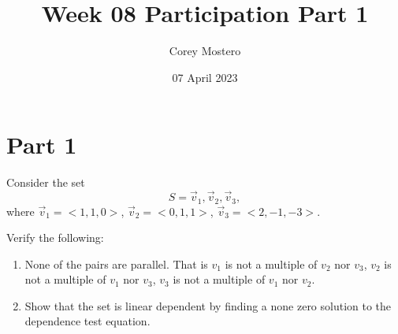 \documentclass{article}
\begin{document}
\title{Week 08 Participation Part 1}
\date{07 April 2023}
\author{Corey Mostero}

\newcommand{\hr}{\par\noindent\rule{\textwidth}{0.4pt}}

\newcommand{\bc}[1]{
	\begin{equation*}
		\begin{boxed}
			{#1}
		\end{boxed}
	\end{equation*}
}

\newcommand{\cond}[2]{
	\ifmmode
		{#1} \quad {#2}
	\else
		$$ {#1} \quad {#2} $$
	\fi
}

\maketitle
\newpage

\tableofcontents

\section{Part 1}
Consider the set
$$ S = { \vec{v}_1, \vec{v}_2, \vec{v}_3 }, $$
where $ \vec{v}_1 = <1,1,0> $, $ \vec{v}_2 = <0,1,1> $, $ \vec{v}_3 = <2,-1,-3> $.

Verify the following:
\begin{enumerate}[label=\textbf{\alph*)}]
	\item None of the pairs are parallel. That is $ v_1 $ is not a multiple of $ v_2 $ nor $ v_3 $, $ v_2 $ is not a multiple of $ v_1 $ nor $ v_3 $, $ v_3 $ is not a multiple of $ v_1 $ nor $ v_2 $.
	\item Show that the set is linear dependent by finding a none zero solution to the dependence test equation.
\end{enumerate}
\end{document}
